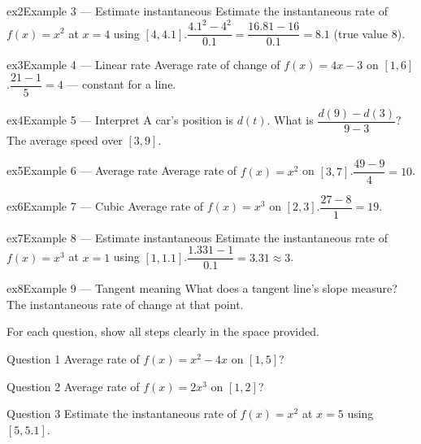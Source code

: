 \documentclass[11pt]{article}
\begin{document}
\begin{example}{ex2}{Example 3 --- Estimate instantaneous}
Estimate the instantaneous rate of $f(x)=x^2$ at $x=4$ using $[4,4.1]$.\soln $\dfrac{4.1^2-4^2}{0.1}=\dfrac{16.81-16}{0.1}=8.1$ (true value $8$).
\end{example}

\begin{example}{ex3}{Example 4 --- Linear rate}
Average rate of change of $f(x)=4x-3$ on $[1,6]$.\soln $\dfrac{21-1}{5}=4$ — constant for a line.
\end{example}

\begin{example}{ex4}{Example 5 --- Interpret}
A car's position is $d(t)$. What is $\dfrac{d(9)-d(3)}{9-3}$?\soln The average speed over $[3,9]$.
\end{example}

\begin{example}{ex5}{Example 6 --- Average rate}
Average rate of $f(x)=x^2$ on $[3,7]$.\soln $\dfrac{49-9}{4}=10$.
\end{example}

\begin{example}{ex6}{Example 7 --- Cubic}
Average rate of $f(x)=x^3$ on $[2,3]$.\soln $\dfrac{27-8}{1}=19$.
\end{example}

\begin{example}{ex7}{Example 8 --- Estimate instantaneous}
Estimate the instantaneous rate of $f(x)=x^3$ at $x=1$ using $[1,1.1]$.\soln $\dfrac{1.331-1}{0.1}=3.31\approx3$.
\end{example}

\begin{example}{ex8}{Example 9 --- Tangent meaning}
What does a tangent line's slope measure?\soln The instantaneous rate of change at that point.
\end{example}

\clearpage
{}
For each question, show all steps clearly in the space provided.

\begin{qbox}{Question 1}
Average rate of $f(x)=x^2-4x$ on $[1,5]$?\workspace{2.4cm}
\end{qbox}

\begin{qbox}{Question 2}
Average rate of $f(x)=2x^3$ on $[1,2]$?\workspace{2.4cm}
\end{qbox}

\begin{qbox}{Question 3}
Estimate the instantaneous rate of $f(x)=x^2$ at $x=5$ using $[5,5.1]$.\workspace{2.4cm}
\end{qbox}
\end{document}
